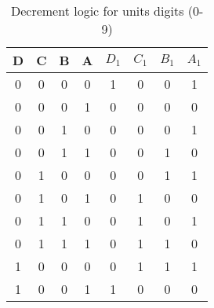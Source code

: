 \begin{table}[ht]
\centering
\caption{Decrement logic for units digits (0-9)}
\begin{tabular}{|c|c|c|c|c|c|c|c|}
\hline
D & C & B & A & $D_1$ & $C_1$ & $B_1$ & $A_1$ \\ 
\hline
0 & 0 & 0 & 0 & 1 & 0 & 0 & 1 \\
0 & 0 & 0 & 1 & 0 & 0 & 0 & 0 \\
0 & 0 & 1 & 0 & 0 & 0 & 0 & 1 \\
0 & 0 & 1 & 1 & 0 & 0 & 1 & 0 \\
0 & 1 & 0 & 0 & 0 & 0 & 1 & 1 \\
0 & 1 & 0 & 1 & 0 & 1 & 0 & 0 \\
0 & 1 & 1 & 0 & 0 & 1 & 0 & 1 \\
0 & 1 & 1 & 1 & 0 & 1 & 1 & 0 \\
1 & 0 & 0 & 0 & 0 & 1 & 1 & 1 \\
1 & 0 & 0 & 1 & 1 & 0 & 0 & 0 \\
\hline
\end{tabular}
\end{table}
